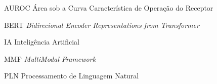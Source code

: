 \begin{siglas}
  \item[AUROC] Área sob a Curva Característica de Operação do Receptor
  \item[BERT] \textit{Bidirecional Encoder Representations from Transformer}
  \item[IA] Inteligência Artificial
  \item[MMF] \textit{MultiModal Framework}
  \item[PLN] Processamento de Linguagem Natural
\end{siglas}